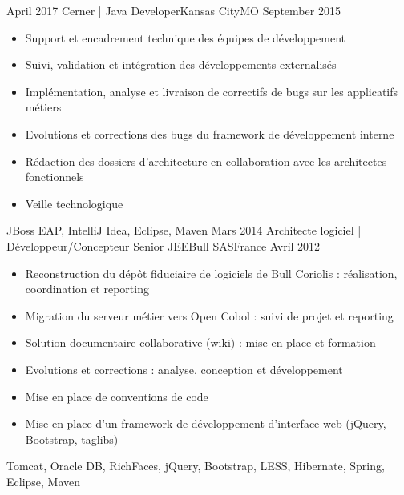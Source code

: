 \begin{experiences}
  \experience
    {April 2017} {Cerner | Java Developer}{Kansas City}{MO}
    {September 2015}    {
                      \begin{itemize}
                        \item Support et encadrement technique des équipes de développement                           
                        \item Suivi, validation et intégration des développements externalisés                        
                        \item Implémentation, analyse et livraison de correctifs de bugs sur les applicatifs métiers  
                        \item Evolutions et corrections des bugs du framework de développement interne                
                        \item Rédaction des dossiers d'architecture en collaboration avec les architectes fonctionnels
                        \item Veille technologique                                                                    
                      \end{itemize}
                    }
                    {JBoss EAP, IntelliJ Idea, Eclipse, Maven}
  \emptySeparator
  \experience
    {Mars 2014}     {Architecte logiciel | Développeur/Concepteur Senior JEE}{Bull SAS}{France}
    {Avril 2012}    {
                      \begin{itemize}
                        \item Reconstruction du dépôt fiduciaire de logiciels de Bull Coriolis : réalisation, coordination et reporting
                        \item Migration du serveur métier vers Open Cobol : suivi de projet et reporting                
                        \item Solution documentaire collaborative (wiki) : mise en place et formation                   
                        \item Evolutions et corrections : analyse, conception et développement                          
                        \item Mise en place de conventions de code                                                      
                        \item Mise en place d'un framework de développement d'interface web (jQuery, Bootstrap, taglibs)
                      \end{itemize}
                    }
                    {Tomcat, Oracle DB, RichFaces, jQuery, Bootstrap, LESS, Hibernate, Spring, Eclipse, Maven}
\end{experiences}
